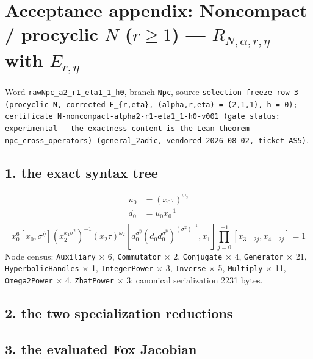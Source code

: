 %

\section{Acceptance appendix: Noncompact / procyclic $N$ ($r \ge 1$) --- $R_{N,\alpha,r,\eta}$ with $E_{r,\eta}$}
\label{sec:appendix-Npc}

Word \texttt{rawNpc\_a2\_r1\_eta1\_1\_h0}, branch \texttt{Npc}, source \texttt{selection-freeze row 3 (procyclic N, corrected E\_\{r,eta\}, (alpha,r,eta) = (2,1,1), h = 0); certificate N-noncompact-alpha2-r1-eta1\_1-h0-v001 (gate status: experimental — the exactness content is the Lean theorem npc\_cross\_operators) (general\_2adic, vendored 2026-08-02, ticket AS5)}.

\subsection{1. the exact syntax tree}
\begin{align*}
  u_0 &= (x_0\tau)^{\omega_2}\\
  d_0 &= u_0x_0^{-1}\\
\end{align*}
\[ x_0^6[x_0,\sigma^{\widehat{\eta}}](x_2^{x_1\sigma^2})^{-1}(x_2\tau)^{\omega_2}[d_0^{\sigma^{\widehat{\eta}}}(d_0d_0^{\sigma^{\widehat{\eta}}})^{(\sigma^2)^{-1}},x_1]\prod_{j=0}^{-1}[x_{3+2j},x_{4+2j}] = 1 \]
Node census: \texttt{Auxiliary} $\times$ 6, \texttt{Commutator} $\times$ 2, \texttt{Conjugate} $\times$ 4, \texttt{Generator} $\times$ 21, \texttt{HyperbolicHandles} $\times$ 1, \texttt{IntegerPower} $\times$ 3, \texttt{Inverse} $\times$ 5, \texttt{Multiply} $\times$ 11, \texttt{Omega2Power} $\times$ 4, \texttt{ZhatPower} $\times$ 3; canonical serialization 2231 bytes.

\subsection{2. the two specialization reductions}

\subsection{3. the evaluated Fox Jacobian}

